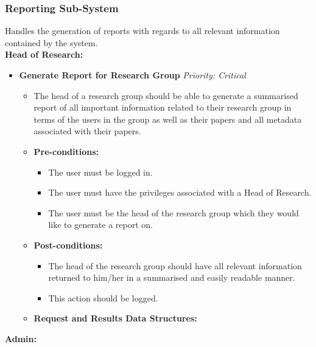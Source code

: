 \documentclass{article}
\begin{document}
			\subsubsection{Reporting Sub-System}\label{subsubsec:report}
				Handles the generation of reports with regards to all relevant information contained by the system.\\
				[3mm]
				\textbf{Head of Research:}
				\begin{itemize}
					\item \textbf{Generate Report for Research Group} \hfill \textit{Priority: Critical}
					\begin{itemize}
						\item The head of a research group should be able to generate a summarised report of all important information related to their research group in terms of the users in the group as well as their papers and all metadata associated with their papers.
						\item \textbf{Pre-conditions:}
						\begin{itemize}
							\item The user must be logged in.
							\item The user must have the privileges associated with a Head of Research.
							\item The user must be the head of the research group which they would like to generate a report on.
						\end{itemize}
						\item \textbf{Post-conditions:}
						\begin{itemize}
							\item The head of the research group should have all relevant information returned to him/her in a summarised and easily readable manner.
							\item This action should be logged.
						\end{itemize}
						\item \textbf{Request and Results Data Structures:}
					\end{itemize}
				\end{itemize}
				\textbf{Admin:}
\end{document}
